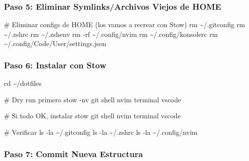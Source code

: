 \documentclass[
  doc,
  floatsintext,
  longtable,
  a4paper,
  nolmodern,
  notxfonts,
  notimes,
  12pt,
  colorlinks=true,linkcolor=blue,citecolor=blue,urlcolor=blue]{apa7}
\newenvironment{Shaded}{\begin{snugshade}}{\end{snugshade}}
\newcommand{\AttributeTok}[1]{\textcolor[rgb]{0.40,0.45,0.13}{#1}}
\newcommand{\BuiltInTok}[1]{\textcolor[rgb]{0.00,0.23,0.31}{#1}}
\newcommand{\CommentTok}[1]{\textcolor[rgb]{0.37,0.37,0.37}{#1}}
\newcommand{\ExtensionTok}[1]{\textcolor[rgb]{0.00,0.23,0.31}{#1}}
\newcommand{\FunctionTok}[1]{\textcolor[rgb]{0.28,0.35,0.67}{#1}}
\newcommand{\NormalTok}[1]{\textcolor[rgb]{0.00,0.23,0.31}{#1}}
\begin{document}
\subsubsection{Paso 5: Eliminar Symlinks/Archivos Viejos de
HOME}\label{paso-5-eliminar-symlinksarchivos-viejos-de-home}

\begin{Shaded}
\begin{Highlighting}[]
\CommentTok{\# Eliminar configs de HOME (los vamos a recrear con Stow)}
\FunctionTok{rm}\NormalTok{ \textasciitilde{}/.gitconfig}
\FunctionTok{rm}\NormalTok{ \textasciitilde{}/.zshrc}
\FunctionTok{rm}\NormalTok{ \textasciitilde{}/.zshenv}
\FunctionTok{rm} \AttributeTok{{-}rf}\NormalTok{ \textasciitilde{}/.config/nvim}
\FunctionTok{rm}\NormalTok{ \textasciitilde{}/.config/konsolerc}
\FunctionTok{rm}\NormalTok{ \textasciitilde{}/.config/Code/User/settings.json}
\end{Highlighting}
\end{Shaded}

\subsubsection{Paso 6: Instalar con
Stow}\label{paso-6-instalar-con-stow}

\begin{Shaded}
\begin{Highlighting}[]
\BuiltInTok{cd}\NormalTok{ \textasciitilde{}/dotfiles}

\CommentTok{\# Dry run primero}
\ExtensionTok{stow} \AttributeTok{{-}nv}\NormalTok{ git shell nvim terminal vscode}

\CommentTok{\# Si todo OK, instalar}
\ExtensionTok{stow}\NormalTok{ git shell nvim terminal vscode}

\CommentTok{\# Verificar}
\FunctionTok{ls} \AttributeTok{{-}la}\NormalTok{ \textasciitilde{}/.gitconfig}
\FunctionTok{ls} \AttributeTok{{-}la}\NormalTok{ \textasciitilde{}/.zshrc}
\FunctionTok{ls} \AttributeTok{{-}la}\NormalTok{ \textasciitilde{}/.config/nvim}
\end{Highlighting}
\end{Shaded}

\subsubsection{Paso 7: Commit Nueva
Estructura}\label{paso-7-commit-nueva-estructura}
\end{document}
